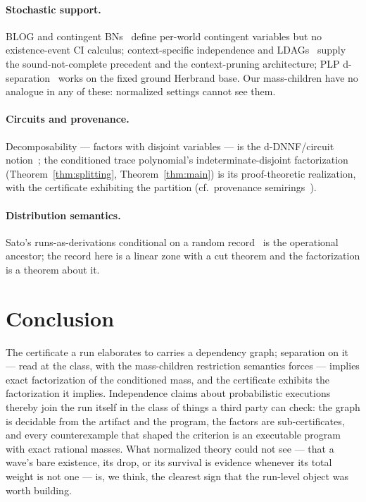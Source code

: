 \documentclass[11pt]{article}
\theoremstyle{definition}
\theoremstyle{remark}
\begin{document}
\paragraph{Stochastic support.}  BLOG and contingent
BNs~\cite{MilchBLOG2005,MilchCBN2005} define per-world contingent
variables but no existence-event CI calculus;
context-specific independence and
LDAGs~\cite{Boutilier1996,Pensar2015} supply the sound-not-complete
precedent and the context-pruning architecture; PLP
d-separation~\cite{RueckschlossWeitkaemper2023} works on the fixed
ground Herbrand base.  Our mass-children have no analogue in any of
these: normalized settings cannot see them.

\paragraph{Circuits and provenance.}  Decomposability --- factors with
disjoint variables --- is the d-DNNF/circuit
notion~\cite{DarwicheMarquis2002}; the conditioned trace polynomial's
indeterminate-disjoint factorization (Theorem~\ref{thm:splitting},
Theorem~\ref{thm:main}) is its proof-theoretic realization, with the
certificate exhibiting the partition
(cf.~provenance semirings~\cite{GreenKT2007}).

\paragraph{Distribution semantics.}  Sato's runs-as-derivations
conditional on a random record~\cite{Sato1995} is the operational
ancestor; the record here is a linear zone with a cut theorem and the
factorization is a theorem about it.

\section{Conclusion}
\label{sec:conclusion}

The certificate a run elaborates to carries a dependency graph;
separation on it --- read at the class, with the mass-children
restriction semantics forces --- implies exact factorization of the
conditioned mass, and the certificate exhibits the factorization it
implies.  Independence claims about probabilistic executions thereby
join the run itself in the class of things a third party can check:
the graph is decidable from the artifact and the program, the factors
are sub-certificates, and every counterexample that shaped the
criterion is an executable program with exact rational masses.  What
normalized theory could not see --- that a wave's bare existence, its
drop, or its survival is evidence whenever its total weight is not
one --- is, we think, the clearest sign that the run-level object was
worth building.
\end{document}
